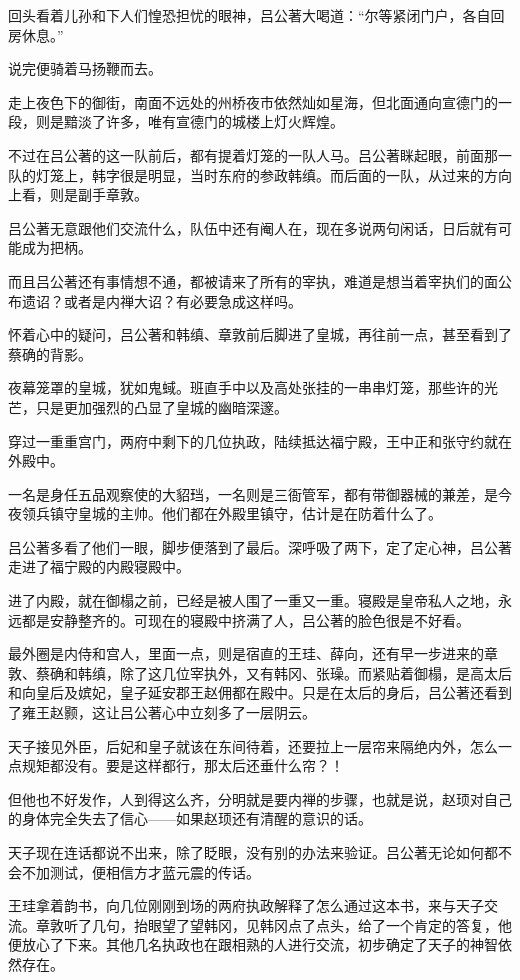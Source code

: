 回头看着儿孙和下人们惶恐担忧的眼神，吕公著大喝道：“尔等紧闭门户，各自回房休息。”

说完便骑着马扬鞭而去。

走上夜色下的御街，南面不远处的州桥夜市依然灿如星海，但北面通向宣德门的一段，则是黯淡了许多，唯有宣德门的城楼上灯火辉煌。

不过在吕公著的这一队前后，都有提着灯笼的一队人马。吕公著眯起眼，前面那一队的灯笼上，韩字很是明显，当时东府的参政韩缜。而后面的一队，从过来的方向上看，则是副手章敦。

吕公著无意跟他们交流什么，队伍中还有阉人在，现在多说两句闲话，日后就有可能成为把柄。

而且吕公著还有事情想不通，都被请来了所有的宰执，难道是想当着宰执们的面公布遗诏？或者是内禅大诏？有必要急成这样吗。

怀着心中的疑问，吕公著和韩缜、章敦前后脚进了皇城，再往前一点，甚至看到了蔡确的背影。

夜幕笼罩的皇城，犹如鬼蜮。班直手中以及高处张挂的一串串灯笼，那些许的光芒，只是更加强烈的凸显了皇城的幽暗深邃。

穿过一重重宫门，两府中剩下的几位执政，陆续抵达福宁殿，王中正和张守约就在外殿中。

一名是身任五品观察使的大貂珰，一名则是三衙管军，都有带御器械的兼差，是今夜领兵镇守皇城的主帅。他们都在外殿里镇守，估计是在防着什么了。

吕公著多看了他们一眼，脚步便落到了最后。深呼吸了两下，定了定心神，吕公著走进了福宁殿的内殿寝殿中。

进了内殿，就在御榻之前，已经是被人围了一重又一重。寝殿是皇帝私人之地，永远都是安静整齐的。可现在的寝殿中挤满了人，吕公著的脸色很是不好看。

最外圈是内侍和宫人，里面一点，则是宿直的王珪、薛向，还有早一步进来的章敦、蔡确和韩缜，除了这几位宰执外，又有韩冈、张璪。而紧贴着御榻，是高太后和向皇后及嫔妃，皇子延安郡王赵佣都在殿中。只是在太后的身后，吕公著还看到了雍王赵颢，这让吕公著心中立刻多了一层阴云。

天子接见外臣，后妃和皇子就该在东间待着，还要拉上一层帘来隔绝内外，怎么一点规矩都没有。要是这样都行，那太后还垂什么帘？！

但他也不好发作，人到得这么齐，分明就是要内禅的步骤，也就是说，赵顼对自己的身体完全失去了信心——如果赵顼还有清醒的意识的话。

天子现在连话都说不出来，除了眨眼，没有别的办法来验证。吕公著无论如何都不会不加测试，便相信方才蓝元震的传话。

王珪拿着韵书，向几位刚刚到场的两府执政解释了怎么通过这本书，来与天子交流。章敦听了几句，抬眼望了望韩冈，见韩冈点了点头，给了一个肯定的答复，他便放心了下来。其他几名执政也在跟相熟的人进行交流，初步确定了天子的神智依然存在。

